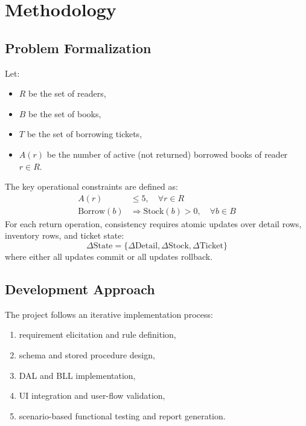 \documentclass[12pt,a4paper]{article}
\begin{document}
\section{Methodology}
\subsection{Problem Formalization}
Let:
\begin{itemize}[leftmargin=1.5cm]
    \item $R$ be the set of readers,
    \item $B$ be the set of books,
    \item $T$ be the set of borrowing tickets,
    \item $A(r)$ be the number of active (not returned) borrowed books of reader $r \in R$.
\end{itemize}
The key operational constraints are defined as:
\begin{align}
    A(r) &\leq 5, \quad \forall r \in R \\
    \text{Borrow}(b) &\Rightarrow \text{Stock}(b) > 0, \quad \forall b \in B
\end{align}
For each return operation, consistency requires atomic updates over detail rows, inventory rows, and ticket state:
\begin{equation}
    \Delta \text{State} = \{\Delta \text{Detail}, \Delta \text{Stock}, \Delta \text{Ticket}\}
\end{equation}
where either all updates commit or all updates rollback.

\subsection{Development Approach}
The project follows an iterative implementation process:
\begin{enumerate}[leftmargin=1.5cm]
    \item requirement elicitation and rule definition,
    \item schema and stored procedure design,
    \item DAL and BLL implementation,
    \item UI integration and user-flow validation,
    \item scenario-based functional testing and report generation.
\end{enumerate}
\end{document}
